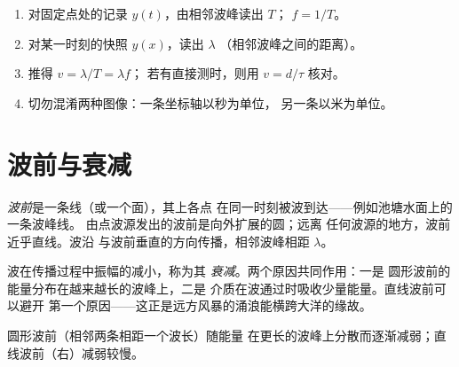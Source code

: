 \begin{method}[读取双重周期性]\label{met:g12:mechanical-waves:reading}
\begin{enumerate}
  \item 对固定点处的记录 $y(t)$，由相邻波峰读出 $T$；
        $f = 1/T$。
  \item 对某一时刻的快照 $y(x)$，读出 $\lambda$
        （相邻波峰之间的距离）。
  \item 推得 $v = \lambda/T = \lambda f$；
        若有直接测时，则用 $v = d/\tau$ 核对。
  \item 切勿混淆两种图像：一条坐标轴以秒为单位，
        另一条以米为单位。
\end{enumerate}
\end{method}

\section{波前与衰减}

\begin{definition}[波前]\label{def:g12:mechanical-waves:wavefront}
\emph{波前}是一条线（或一个面），其上各点
在同一时刻被波到达——例如池塘水面上的一条波峰线。
由点波源发出的波前是向外扩展的圆；远离
任何波源的地方，波前近乎直线。波沿
与波前垂直的方向传播，相邻波峰相距 $\lambda$。
\end{definition}

\begin{definition}[衰减]\label{def:g12:mechanical-waves:attenuation}
波在传播过程中振幅的减小，称为其
\emph{衰减}。两个原因共同作用：一是
圆形波前的能量分布在越来越长的波峰上，二是
介质在波通过时吸收少量能量。直线波前可以避开
第一个原因——这正是远方风暴的涌浪能横跨大洋的缘故。
\end{definition}

\begin{omfigure}

{\small 圆形波前（相邻两条相距一个波长）随能量
在更长的波峰上分散而逐渐减弱；直线波前（右）减弱较慢。}
\end{omfigure}

